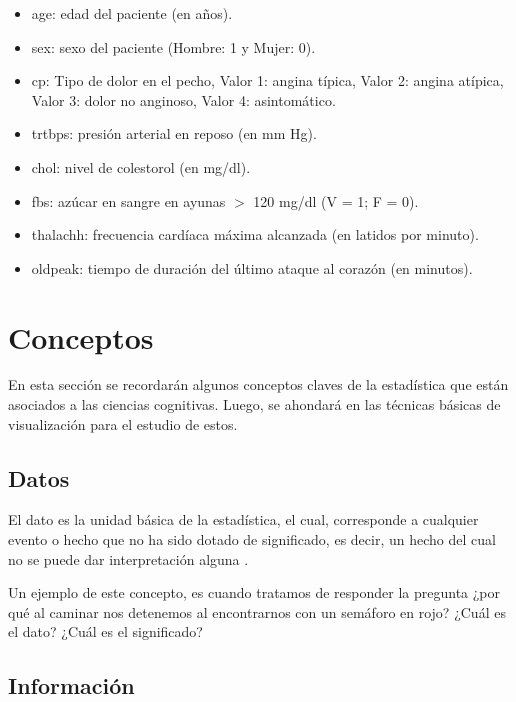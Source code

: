 \documentclass[
  11pt,
]{book}
\providecommand{\tightlist}{%
  \setlength{\itemsep}{0pt}\setlength{\parskip}{0pt}}
\theoremstyle{definition}
\theoremstyle{definition}
\theoremstyle{definition}
\theoremstyle{definition}
\theoremstyle{remark}
\begin{document}
\begin{itemize}
  \begin{itemize}
  \tightlist
  \item
    age: edad del paciente (en años).
  \item
    sex: sexo del paciente (Hombre: 1 y Mujer: 0).
  \item
    cp: Tipo de dolor en el pecho, Valor 1: angina típica, Valor 2: angina atípica, Valor 3: dolor no anginoso, Valor 4: asintomático.
  \item
    trtbps: presión arterial en reposo (en mm Hg).
  \item
    chol: nivel de colestorol (en mg/dl).
  \item
    fbs: azúcar en sangre en ayunas \(>\) 120 mg/dl (V = 1; F = 0).
  \item
    thalachh: frecuencia cardíaca máxima alcanzada (en latidos por minuto).
  \item
    oldpeak: tiempo de duración del último ataque al corazón (en minutos).
  \end{itemize}
\end{itemize}

\section{Conceptos}\label{topicos-conceptos}

En esta sección se recordarán algunos conceptos claves de la estadística que están asociados a las ciencias cognitivas. Luego, se ahondará en las técnicas básicas de visualización para el estudio de estos.

\subsection{Datos}\label{topicos-conceptos-datos}

El dato es la unidad básica de la estadística, el cual, corresponde a cualquier evento o hecho que no ha sido dotado de significado, es decir, un hecho del cual no se puede dar interpretación alguna \citep{brachman_knowledge_2004}.

Un ejemplo de este concepto, es cuando tratamos de responder la pregunta ¿por qué al caminar nos detenemos al encontrarnos con un semáforo en rojo? ¿Cuál es el dato? ¿Cuál es el significado?

\subsection{Información}\label{topicos-conceptos-informacion}
\end{document}
